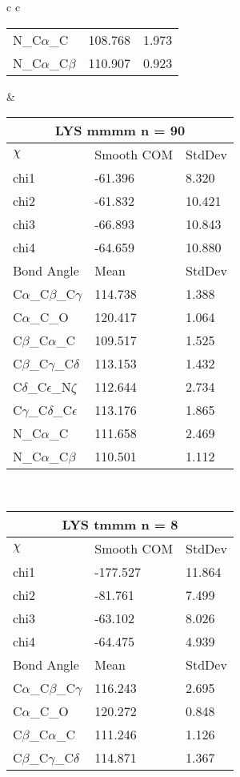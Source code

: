 \begin{longtable}{ c c }
\begin{tabular}{ l l l }
  N\_C$\alpha$\_C & 108.768 & 1.973\\
  N\_C$\alpha$\_C$\beta$ & 110.907 & 0.923\\
  \bottomrule
  \end{tabular}
  &
  \begin{tabular}{ l l l }
  \toprule
  \multicolumn{3}{c}{LYS \textbf{mmmm} n = 90} \\ \toprule
  $\chi$       & Smooth COM & StdDev \\ \midrule
  chi1 & -61.396 & 8.320 \\ 
  chi2 & -61.832 & 10.421 \\ 
  chi3 & -66.893 & 10.843 \\ 
  chi4 & -64.659 & 10.880 \\ \midrule
  Bond Angle   & Mean     & StdDev \\ \midrule
  C$\alpha$\_C$\beta$\_C$\gamma$ & 114.738 & 1.388\\
  C$\alpha$\_C\_O & 120.417 & 1.064\\
  C$\beta$\_C$\alpha$\_C & 109.517 & 1.525\\
  C$\beta$\_C$\gamma$\_C$\delta$ & 113.153 & 1.432\\
  C$\delta$\_C$\epsilon$\_N$\zeta$ & 112.644 & 2.734\\
  C$\gamma$\_C$\delta$\_C$\epsilon$ & 113.176 & 1.865\\
  N\_C$\alpha$\_C & 111.658 & 2.469\\
  N\_C$\alpha$\_C$\beta$ & 110.501 & 1.112\\
  \bottomrule
  \end{tabular}
  \\
  \begin{tabular}{ l l l }
  \toprule
  \multicolumn{3}{c}{LYS \textbf{tmmm} n = 8} \\ \toprule
  $\chi$       & Smooth COM & StdDev \\ \midrule
  chi1 & -177.527 & 11.864 \\ 
  chi2 & -81.761 & 7.499 \\ 
  chi3 & -63.102 & 8.026 \\ 
  chi4 & -64.475 & 4.939 \\ \midrule
  Bond Angle   & Mean     & StdDev \\ \midrule
  C$\alpha$\_C$\beta$\_C$\gamma$ & 116.243 & 2.695\\
  C$\alpha$\_C\_O & 120.272 & 0.848\\
  C$\beta$\_C$\alpha$\_C & 111.246 & 1.126\\
  C$\beta$\_C$\gamma$\_C$\delta$ & 114.871 & 1.367\\

\end{tabular}
\end{longtable}
